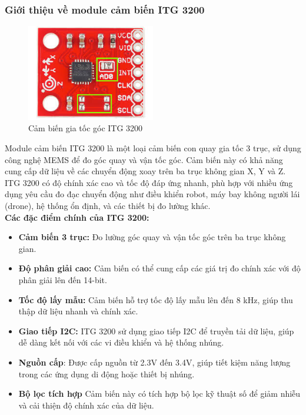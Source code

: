 \subsubsection{Giới thiệu về module cảm biến ITG 3200}
\begin{figure}[H]
    \centering
    \includegraphics[width=0.5\textwidth,height=\textheight,keepaspectratio]{Images/Theoretical basis/ITG3200.jpg}
    \caption{Cảm biến gia tốc góc ITG 3200}
    \label{fig:capacitive_sensor}
\end{figure}
\indent Module cảm biến ITG 3200 là một loại cảm biến con quay gia tốc 3 trục, sử dụng công nghệ MEMS để đo góc quay và vận tốc góc. Cảm biến này có khả năng cung cấp dữ liệu về các chuyển động xoay trên ba trục không gian X, Y và Z. ITG 3200 có độ chính xác cao và tốc độ đáp ứng nhanh, phù hợp với nhiều ứng dụng yêu cầu đo đạc chuyển động như điều khiển robot, máy bay không người lái (drone), hệ thống ổn định, và các thiết bị đo lường khác.
\\
\textbf{Các đặc điểm chính của ITG 3200:}
\begin{itemize}
\item \textbf{Cảm biến 3 trục:} Đo lường góc quay và vận tốc góc trên ba trục không gian.
\item \textbf{Độ phân giải cao:} Cảm biến có thể cung cấp các giá trị đo chính xác với độ phân giải lên đến 14-bit.
 \item \textbf{Tốc độ lấy mẫu:} Cảm biến hỗ trợ tốc độ lấy mẫu lên đến 8 kHz, giúp thu thập dữ liệu nhanh và chính xác.
 \item \textbf{Giao tiếp I2C:} ITG 3200 sử dụng giao tiếp I2C để truyền tải dữ liệu, giúp dễ dàng kết nối với các vi điều khiển và hệ thống nhúng.
\item \textbf{Nguồn cấp}: Được cấp nguồn từ 2.3V đến 3.4V, giúp tiết kiệm năng lượng trong các ứng dụng di động hoặc thiết bị nhúng.
\item \textbf{Bộ lọc tích hợp} Cảm biến này có tích hợp bộ lọc kỹ thuật số để giảm nhiễu và cải thiện độ chính xác của dữ liệu.
\end{itemize}
